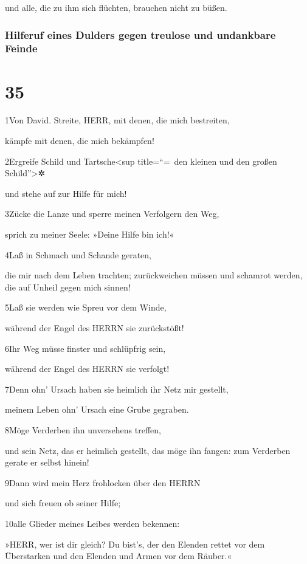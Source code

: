 und alle, die zu ihm sich flüchten, brauchen nicht zu büßen.

\hypertarget{hilferuf-eines-dulders-gegen-treulose-und-undankbare-feinde}{%
\subsubsection{Hilferuf eines Dulders gegen treulose und undankbare
Feinde}\label{hilferuf-eines-dulders-gegen-treulose-und-undankbare-feinde}}

\hypertarget{section-34}{%
\section{35}\label{section-34}}

1Von David. Streite, HERR, mit denen, die mich bestreiten,

kämpfe mit denen, die mich bekämpfen!

2Ergreife Schild und Tartsche\textless sup title=``=~den kleinen und den
großen Schild''\textgreater✲

und stehe auf zur Hilfe für mich!

3Zücke die Lanze und sperre meinen Verfolgern den Weg,

sprich zu meiner Seele: »Deine Hilfe bin ich!«

4Laß in Schmach und Schande geraten,

die mir nach dem Leben trachten; zurückweichen müssen und schamrot
werden, die auf Unheil gegen mich sinnen!

5Laß sie werden wie Spreu vor dem Winde,

während der Engel des HERRN sie zurückstößt!

6Ihr Weg müsse finster und schlüpfrig sein,

während der Engel des HERRN sie verfolgt!

7Denn ohn' Ursach haben sie heimlich ihr Netz mir gestellt,

meinem Leben ohn' Ursach eine Grube gegraben.

8Möge Verderben ihn unversehens treffen,

und sein Netz, das er heimlich gestellt, das möge ihn fangen: zum
Verderben gerate er selbst hinein!

9Dann wird mein Herz frohlocken über den HERRN

und sich freuen ob seiner Hilfe;

10alle Glieder meines Leibes werden bekennen:

»HERR, wer ist dir gleich? Du bist's, der den Elenden rettet vor dem
Überstarken und den Elenden und Armen vor dem Räuber.«

